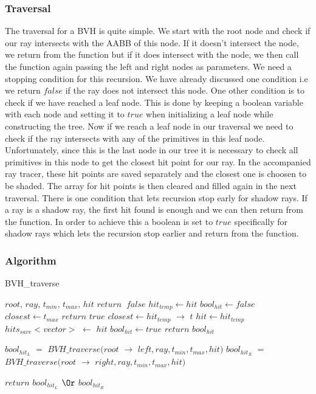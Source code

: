 \documentclass[11pt,a4paper]{article}
\begin{document}
\subsubsection{Traversal}
The traversal for a BVH is quite simple. We start with the root node and check if our ray intersects with the AABB of this node. If it doesn't intersect the node, we return from the function but if it does intersect with the node, we then call the function again passing the left and right nodes as parameters. We need a stopping condition for this recursion. We have already discussed one condition i.e we return $false$ if the ray does not intersect this node. One other condition is to check if we have reached a leaf node. This is done by keeping a boolean variable with each node and setting it to $true$ when initializing a leaf node while constructing the tree. Now if we reach a leaf node in our traversal we need to check if the ray intersects with any of the primitives in this leaf node. Unfortunately, since this is the last node in our tree it is necessary to check all primitives in this node to get the closest hit point for our ray. In the accompanied ray tracer, these hit points are saved separately and the closest one is choosen to be shaded. The array for hit points is then cleared and filled again in the next traversal. There is one condition that lets recursion stop early for shadow rays. If a ray is a shadow ray, the first hit found is enough and we can then return from the function. In order to achieve this a boolean is set to $true$ specifically for shadow rays which lets the recursion stop earlier and return from the function.
\subsubsection{Algorithm}
\begin{algorithm}
	\caption{BVH\_traverse}\label{alg:cap}
	\begin{algorithmic}
		\Require $root$, $ray$, $t_{min}$, $t_{max}$, $hit$
			\State $return\;\;false$
		\EndIf
			\State $hit_{temp} \leftarrow hit$
			\State $bool_{hit} \leftarrow false$
			\State $closest \leftarrow t_{max}$
			\State $return$ $true$ 
			\EndIf
			\State $closest \leftarrow hit_{temp}$ $\rightarrow$ $t$
			\State $hit \leftarrow hit_{temp}$
			\State $hits_{save}<vector>$ $\leftarrow$ $hit$
			\State $bool_{hit} \leftarrow true$
			\EndIf
			\EndFor
			\State $return$ $bool_{hit}$
		\EndIf
		
		\State $bool_{hit_{L}}$ $=$ $BVH\_traverse(root$ $\rightarrow$ $left, ray, t_{min}, t_{max}, hit)$
		\State $bool_{hit_{R}}$ $=$ $BVH\_traverse(root$ $\rightarrow$ $right, ray, t_{min}, t_{max}, hit)$
	
		\State $return$ $bool_{hit_{L}}$ $\Or$ $bool_{hit_{R}}$
	\end{algorithmic}
\end{algorithm}
\pagebreak
\end{document}
